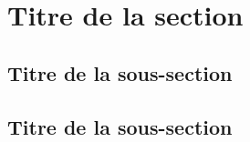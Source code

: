 \clearpage 



\section{Titre de la section}

\subsection{Titre de la sous-section}

\subsection{Titre de la sous-section}